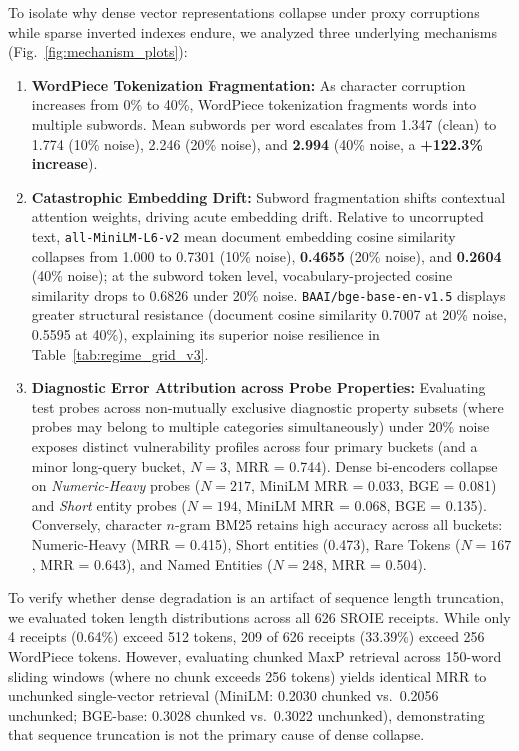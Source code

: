 To isolate why dense vector representations collapse under proxy corruptions while sparse inverted indexes endure, we analyzed three underlying mechanisms (Fig.~\ref{fig:mechanism_plots}):
\begin{enumerate}
    \setlength{\itemsep}{0pt}
    \setlength{\parskip}{0pt}
    \setlength{\parsep}{0pt}
    \setlength{\topsep}{1pt}
    \item \textbf{WordPiece Tokenization Fragmentation:} As character corruption increases from 0\% to 40\%, WordPiece tokenization fragments words into multiple subwords. Mean subwords per word escalates from 1.347 (clean) to 1.774 (10\% noise), 2.246 (20\% noise), and \textbf{2.994} (40\% noise, a \textbf{+122.3\% increase}).
    \item \textbf{Catastrophic Embedding Drift:} Subword fragmentation shifts contextual attention weights, driving acute embedding drift. Relative to uncorrupted text, \texttt{all-MiniLM-L6-v2} mean document embedding cosine similarity collapses from 1.000 to 0.7301 (10\% noise), \textbf{0.4655} (20\% noise), and \textbf{0.2604} (40\% noise); at the subword token level, vocabulary-projected cosine similarity drops to 0.6826 under 20\% noise. \texttt{BAAI/bge-base-en-v1.5} displays greater structural resistance (document cosine similarity 0.7007 at 20\% noise, 0.5595 at 40\%), explaining its superior noise resilience in Table~\ref{tab:regime_grid_v3}.
    \item \textbf{Diagnostic Error Attribution across Probe Properties:} Evaluating test probes across non-mutually exclusive diagnostic property subsets (where probes may belong to multiple categories simultaneously) under 20\% noise exposes distinct vulnerability profiles across four primary buckets (and a minor long-query bucket, $N=3$, MRR = 0.744). Dense bi-encoders collapse on \emph{Numeric-Heavy} probes ($N=217$, MiniLM MRR = 0.033, BGE = 0.081) and \emph{Short} entity probes ($N=194$, MiniLM MRR = 0.068, BGE = 0.135). Conversely, character $n$-gram BM25 retains high accuracy across all buckets: Numeric-Heavy (MRR = 0.415), Short entities (0.473), Rare Tokens ($N=167$, MRR = 0.643), and Named Entities ($N=248$, MRR = 0.504).
\end{enumerate}

To verify whether dense degradation is an artifact of sequence length truncation, we evaluated token length distributions across all 626 SROIE receipts. While only 4 receipts (0.64\%) exceed 512 tokens, 209 of 626 receipts (33.39\%) exceed 256 WordPiece tokens. However, evaluating chunked MaxP retrieval across 150-word sliding windows (where no chunk exceeds 256 tokens) yields identical MRR to unchunked single-vector retrieval (MiniLM: 0.2030 chunked vs.\ 0.2056 unchunked; BGE-base: 0.3028 chunked vs.\ 0.3022 unchunked), demonstrating that sequence truncation is not the primary cause of dense collapse.

